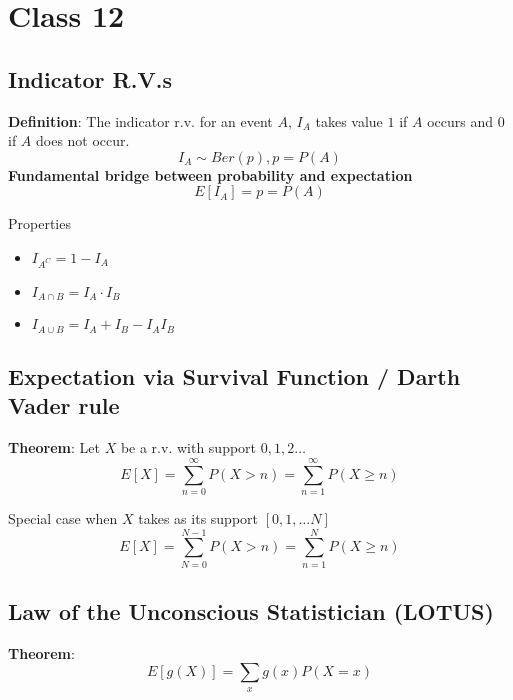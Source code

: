 \chapter{Class 12}

\section{Indicator R.V.s}

\begin{framed}
   \textbf{Definition}: The indicator r.v. for an event $A$, $I_A$ takes value $1$ if $A$ occurs and $0$ if $A$ does not occur. 
   \[
     I_A \sim Ber(p), p = P(A)
   \] 
   \textbf{Fundamental bridge between probability and expectation}
   \[
     E\left[ I_A\right]  = p = P(A)
   \] 

   Properties
   \begin{itemize}
      \item $I_{A^C} = 1 - I_A$
      \item $I_{A \cap B} = I_A \cdot I_B$
      \item $I_{A \cup B} = I_A +I_B - I_A I_B$
   \end{itemize}
\end{framed}

\section{Expectation via Survival Function / Darth Vader rule}

\begin{framed}
   \textbf{Theorem}: Let $X$ be a r.v. with support $0, 1, 2 \hdots$
   \[
      E\left[ X\right]  = \sum_{n = 0}^{\infty} P(X > n)  = \sum_{n = 1}^{\infty} P(X \geq n)
   \] 

   Special case when $X$ takes as its support $[0, 1, \hdots N]$
   \[
      E\left[ X\right]  = \sum_{N = 0}^{N - 1} P(X > n) = \sum_{n = 1}^{N} P(X \geq n)
   \]  
\end{framed}

\section{Law of the Unconscious Statistician (LOTUS)}

\begin{framed}
   \textbf{Theorem}: 
   \[
      E\left[ g(X)\right]  = \sum_{x} g(x) P(X = x)
   \] 
  
\end{framed}

